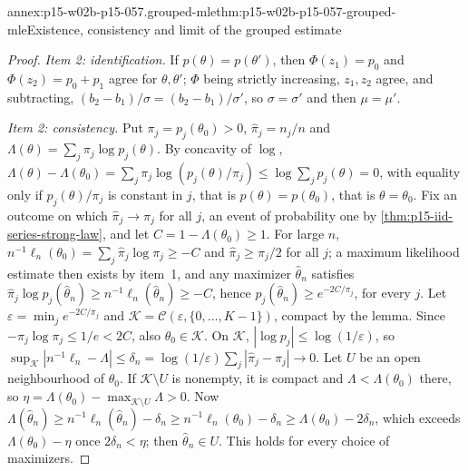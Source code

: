 \begin{annexitem}{annex:p15-w02b-p15-057.grouped-mle}{thm:p15-w02b-p15-057-grouped-mle}{Existence, consistency and limit of the grouped estimate}
\begin{proof}
\emph{Item 2: identification.} If \(p(\theta)=p(\theta')\), then
\(\Phi(z_1)=p_0\) and \(\Phi(z_2)=p_0+p_1\) agree for \(\theta,\theta'\);
\(\Phi\) being strictly increasing, \(z_1,z_2\) agree, and subtracting,
\((b_2-b_1)/\sigma=(b_2-b_1)/\sigma'\), so \(\sigma=\sigma'\) and then
\(\mu=\mu'\).

\emph{Item 2: consistency.} Put \(\pi_j=p_j(\theta_0)>0\),
\(\hat\pi_j=n_j/n\) and \(\Lambda(\theta)=\sum_j\pi_j\log p_j(\theta)\). By
concavity of \(\log\),
\(\Lambda(\theta)-\Lambda(\theta_0)=\sum_j\pi_j\log(p_j(\theta)/\pi_j)
\leq\log\sum_jp_j(\theta)=0\), with equality only if \(p_j(\theta)/\pi_j\)
is constant in \(j\), that is \(p(\theta)=p(\theta_0)\), that is
\(\theta=\theta_0\). Fix an outcome on which \(\hat\pi_j\to\pi_j\) for all
\(j\), an event of probability one by
\cref{thm:p15-iid-series-strong-law}, and let
\(C=1-\Lambda(\theta_0)\geq1\). For large \(n\),
\(n^{-1}\ell_n(\theta_0)=\sum_j\hat\pi_j\log\pi_j\geq-C\) and
\(\hat\pi_j\geq\pi_j/2\) for all \(j\); a maximum likelihood estimate then
exists by item~1, and any maximizer \(\widehat\theta_n\) satisfies
\(\hat\pi_j\log p_j(\widehat\theta_n)\geq n^{-1}\ell_n(\widehat\theta_n)
\geq-C\), hence \(p_j(\widehat\theta_n)\geq e^{-2C/\pi_j}\), for every
\(j\). Let \(\varepsilon=\min_je^{-2C/\pi_j}\) and
\(\mathcal K=\mathcal C(\varepsilon,\{0,\ldots,K-1\})\), compact by the lemma.
Since \(-\pi_j\log\pi_j\leq1/e<2C\), also \(\theta_0\in\mathcal K\). On
\(\mathcal K\), \(|\log p_j|\leq\log(1/\varepsilon)\), so
\(\sup_{\mathcal K}|n^{-1}\ell_n-\Lambda|\leq\delta_n=\log(1/\varepsilon)
\sum_j|\hat\pi_j-\pi_j|\to0\). Let \(U\) be an open neighbourhood of
\(\theta_0\). If \(\mathcal K\setminus U\) is nonempty, it is compact and
\(\Lambda<\Lambda(\theta_0)\) there, so
\(\eta=\Lambda(\theta_0)-\max_{\mathcal K\setminus U}\Lambda>0\). Now
\(\Lambda(\widehat\theta_n)\geq n^{-1}\ell_n(\widehat\theta_n)-\delta_n
\geq n^{-1}\ell_n(\theta_0)-\delta_n\geq\Lambda(\theta_0)-2\delta_n\), which
exceeds \(\Lambda(\theta_0)-\eta\) once \(2\delta_n<\eta\); then
\(\widehat\theta_n\in U\). This holds for every choice of maximizers.


\end{proof}
\end{annexitem}
